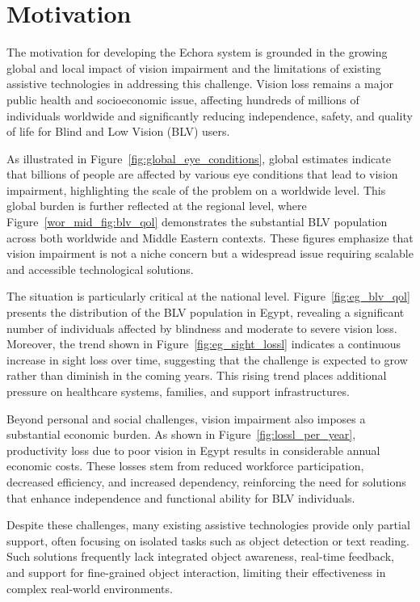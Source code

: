 \section{Motivation}

The motivation for developing the Echora system is grounded in the growing global and local impact of vision impairment and the limitations of existing assistive technologies in addressing this challenge. Vision loss remains a major public health and socioeconomic issue, affecting hundreds of millions of individuals worldwide and significantly reducing independence, safety, and quality of life for Blind and Low Vision (BLV) users.

As illustrated in Figure~\ref{fig:global_eye_conditions}, global estimates indicate that billions of people are affected by various eye conditions that lead to vision impairment, highlighting the scale of the problem on a worldwide level. This global burden is further reflected at the regional level, where Figure~\ref{wor_mid_fig:blv_qol} demonstrates the substantial BLV population across both worldwide and Middle Eastern contexts. These figures emphasize that vision impairment is not a niche concern but a widespread issue requiring scalable and accessible technological solutions.

The situation is particularly critical at the national level. Figure~\ref{fig:eg_blv_qol} presents the distribution of the BLV population in Egypt, revealing a significant number of individuals affected by blindness and moderate to severe vision loss. Moreover, the trend shown in Figure~\ref{fig:eg_sight_lossl} indicates a continuous increase in sight loss over time, suggesting that the challenge is expected to grow rather than diminish in the coming years. This rising trend places additional pressure on healthcare systems, families, and support infrastructures.

Beyond personal and social challenges, vision impairment also imposes a substantial economic burden. As shown in Figure~\ref{fig:lossl_per_year}, productivity loss due to poor vision in Egypt results in considerable annual economic costs. These losses stem from reduced workforce participation, decreased efficiency, and increased dependency, reinforcing the need for solutions that enhance independence and functional ability for BLV individuals.

Despite these challenges, many existing assistive technologies provide only partial support, often focusing on isolated tasks such as object detection or text reading. Such solutions frequently lack integrated object awareness, real-time feedback, and support for fine-grained object interaction, limiting their effectiveness in complex real-world environments.

